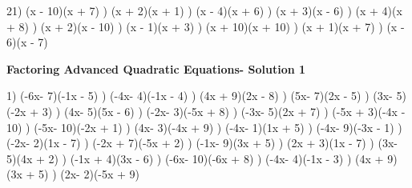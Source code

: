 \documentclass{article}%
\begin{document}
21) (x - 10)(x + 7)%
) (x + 2)(x + 1)%
) (x - 4)(x + 6)%
) (x + 3)(x - 6)%
) (x + 4)(x + 8)%
) (x + 2)(x - 10)%
) (x - 1)(x + 3)%
) (x + 10)(x + 10)%
) (x + 1)(x + 7)%
) (x - 6)(x - 7)%
\newline%
\newpage%
\large%
\begin{center}%
\textbf{Factoring Advanced Quadratic Equations- Solution 1}%
\newline%
\end{center} \normalsize%
1) (-6x- 7)(-1x - 5)%
) (-4x- 4)(-1x - 4)%
) (4x + 9)(2x - 8)%
) (5x- 7)(2x - 5)%
) (3x- 5)(-2x + 3)%
) (4x- 5)(5x - 6)%
) (-2x- 3)(-5x + 8)%
) (-3x- 5)(2x + 7)%
) (-5x + 3)(-4x - 10)%
) (-5x- 10)(-2x + 1)%
) (4x- 3)(-4x + 9)%
) (-4x- 1)(1x + 5)%
) (-4x- 9)(-3x - 1)%
) (-2x- 2)(1x - 7)%
) (-2x + 7)(-5x + 2)%
) (-1x- 9)(3x + 5)%
) (2x + 3)(1x - 7)%
) (3x- 5)(4x + 2)%
) (-1x + 4)(3x - 6)%
) (-6x- 10)(-6x + 8)%
) (-4x- 4)(-1x - 3)%
) (4x + 9)(3x + 5)%
) (2x- 2)(-5x + 9)%
\newline%
\end{document}
